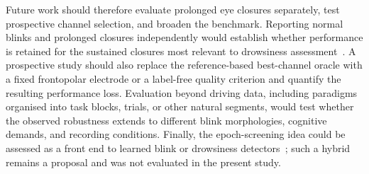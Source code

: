 Future work should therefore evaluate prolonged eye closures separately, test prospective channel selection, and broaden the benchmark. Reporting normal blinks and prolonged closures independently would establish whether performance is retained for the sustained closures most relevant to drowsiness assessment~\citep{tian2021fatigue,shahbakhti2023fusion}. A prospective study should also replace the reference-based best-channel oracle with a fixed frontopolar electrode or a label-free quality criterion and quantify the resulting performance loss. Evaluation beyond driving data, including paradigms organised into task blocks, trials, or other natural segments, would test whether the observed robustness extends to different blink morphologies, cognitive demands, and recording conditions. Finally, the epoch-screening idea could be assessed as a front end to learned blink or drowsiness detectors~\citep{cabot2024drowsiness,makhmudov2024real,zhang2025fatigue}; such a hybrid remains a proposal and was not evaluated in the present study.
